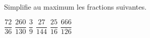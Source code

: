 %
%
Simplifie au maximum les fractions suivantes.
  \begin{tasks}
    \task $\dfrac{72}{36}$
    \task $\dfrac{260}{130}$
    \task $\dfrac{3}{9}$
    \task $\dfrac{27}{144}$
    \task $\dfrac{25}{16}$
    \task $\dfrac{666}{126}$
  \end{tasks}
